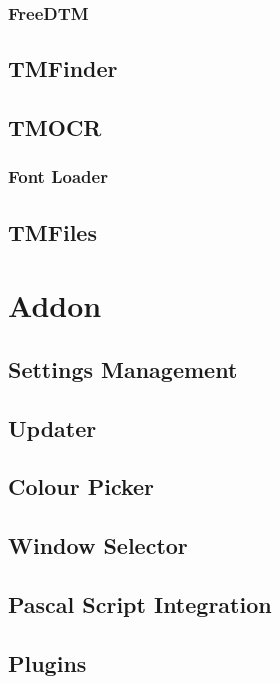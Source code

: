 \documentclass[a4paper]{report}
\begin{document}
\subsection{FreeDTM}

\section{TMFinder}

\section{TMOCR}
\subsection{Font Loader}
\section{TMFiles}

\chapter{Addon}

\section{Settings Management}

\section{Updater}

\section{Colour Picker}

\section{Window Selector}

\section{Pascal Script Integration}

\section{Plugins}
\end{document}
